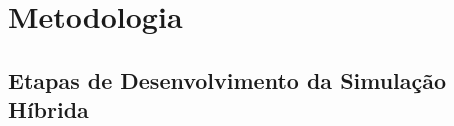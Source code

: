 \chapter{Metodologia}
\label{chap:metodologia}

\section{Etapas de Desenvolvimento da Simulação Híbrida}
